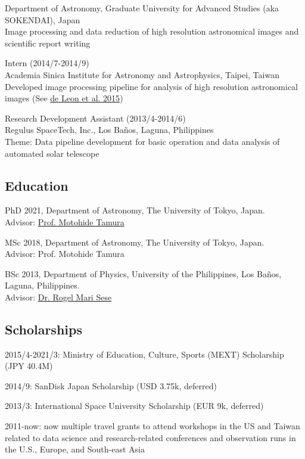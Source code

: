 \documentclass[11pt,letterpaper]{article}
\begin{document}
\begin{list}{}{\cvlist}
        Department of Astronomy, Graduate University for Advanced Studies (aka SOKENDAI), Japan\\
        Image processing and data reduction of high resolution astronomical images and scientific report writing
    \item 
        Intern (2014/7-2014/9)\\
        Academia Sinica Institute for Astronomy and Astrophysics, Taipei, Taiwan\\	
        Developed image processing pipeline for analysis of high resolution astronomical images (See \href{\paperone}{de Leon et al. 2015})
    \item 
        Research Development Assistant (2013/4-2014/6)\\
        Regulus SpaceTech, Inc., Los Ba\~nos, Laguna, Philippines\\
        Theme: Data pipeline development for basic operation and data analysis of automated solar telescope
\end{list}

\subsection{Education}
\begin{list}{}{\cvlist}
    \item
        PhD 2021, Department of Astronomy, The University of Tokyo, Japan.\\Advisor: \href{\tamuraurl}{Prof. Motohide Tamura}
    \item
        MSc 2018, Department of Astronomy, The University of Tokyo, Japan.\\Advisor: Prof. Motohide Tamura
    \item
        BSc 2013, Department of Physics, University of the Philippines, Los Ba\~nos, Laguna, Philippines.\\Advisor: \href{\seseurl}{Dr. Rogel Mari Sese}      
\end{list}

\subsection{Scholarships}
\begin{list}{}{\cvlist}
    \item 2015/4-2021/3: Ministry of Education, Culture, Sports (MEXT) Scholarship (JPY 40.4M)
    \item 2014/9: SanDisk Japan Scholarship (USD 3.75k, deferred)
    \item 2013/3: International Space University Scholarship (EUR 9k, deferred)
    \item 2011-now: now multiple travel grants to attend workshops in the US and Taiwan related to data science and research-related conferences and observation runs in the U.S., Europe, and South-east Asia
\end{list}
\end{document}
